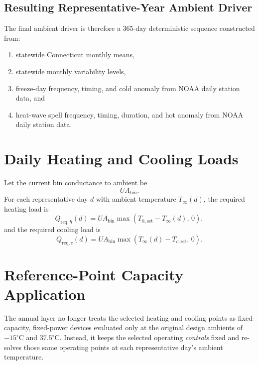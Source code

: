 \documentclass{article}
\begin{document}
\subsection{Resulting Representative-Year Ambient Driver}

The final ambient driver is therefore a 365-day deterministic sequence
constructed from:
\begin{enumerate}
\item statewide Connecticut monthly means,
\item statewide monthly variability levels,
\item freeze-day frequency, timing, and cold anomaly from NOAA daily station
data, and
\item heat-wave spell frequency, timing, duration, and hot anomaly from NOAA
daily station data.
\end{enumerate}

\section{Daily Heating and Cooling Loads}

Let the current bin conductance to ambient be
\begin{equation}
UA_{\mathrm{bin}}.
\end{equation}
For each representative day $d$ with ambient temperature
$T_\infty(d)$, the required heating load is
\begin{equation}
Q_{\mathrm{req},h}(d)
=
UA_{\mathrm{bin}}
\max\!\left(T_{h,\mathrm{set}} - T_\infty(d),\,0\right),
\end{equation}
and the required cooling load is
\begin{equation}
Q_{\mathrm{req},c}(d)
=
UA_{\mathrm{bin}}
\max\!\left(T_\infty(d) - T_{c,\mathrm{set}},\,0\right).
\end{equation}

\section{Reference-Point Capacity Application}

The annual layer no longer treats the selected heating and cooling points as
fixed-capacity, fixed-power devices evaluated only at the original design
ambients of $-15^\circ\mathrm{C}$ and $37.5^\circ\mathrm{C}$. Instead, it
keeps the selected operating \emph{controls} fixed and re-solves those same
operating points at each representative day's ambient temperature.
\end{document}
